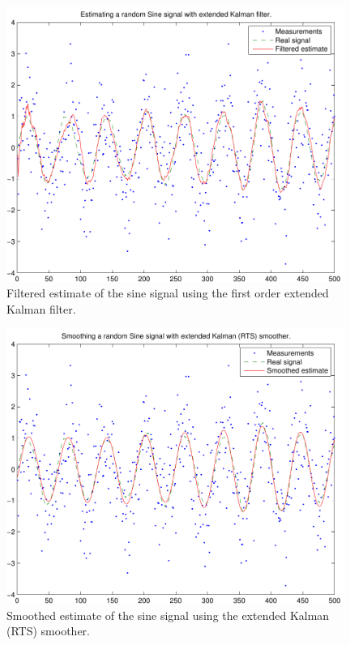 \begin{figure}
\begin{center}
\includegraphics[width=11cm]{pics/demo2_f1}
\caption{Filtered estimate of the sine signal using the first order
extended Kalman filter.}
\label{fig:example2_1}
\end{center}
\end{figure}

\begin{figure}
\begin{center}
\includegraphics[width=11cm]{pics/demo2_f2}
\caption{Smoothed estimate of the sine signal using the extended
Kalman (RTS) smoother.}
\label{fig:example2_2}
\end{center}
\end{figure}

